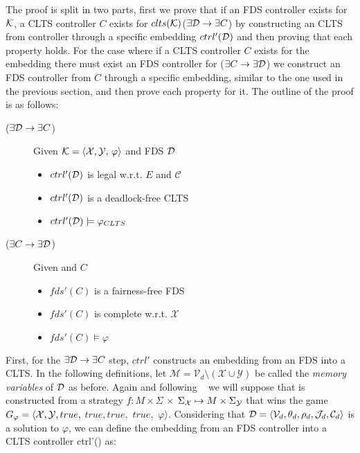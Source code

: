 
The proof is split in two parts, first we prove that if an FDS \fdsD controller exists for $\mathcal{K}$, a CLTS controller $C$ exists for $clts(\mathcal{K})$($\exists \mathcal{D} \rightarrow \exists C$) by constructing an CLTS from controller \fdsD through a specific embedding $ctrl'(\mathcal{D})$ and then proving that each property holds. For the case where if a CLTS controller $C$ exists for the embedding \cltsCPEmbedding there must exist an FDS controller for \fdsControlProblem ($\exists C \rightarrow \exists \mathcal{D}$) we construct an FDS controller from $C$ through a specific embedding, similar to the one used in the previous section, and then prove each property for it. The outline of the proof is as follows:


\begin{description}
	\item[($\exists \mathcal{D} \rightarrow \exists C$)] Given $\fdsControlProblemDef$ and FDS $\mathcal{D}$
		\begin{itemize}
			\item $ctrl'(\mathcal{D})$ is legal w.r.t. $E$ and $\mathcal{C}$
			\item $ctrl'(\mathcal{D})$ is a deadlock-free CLTS			
			\item $ctrl'(\mathcal{D}) \models \varphi_{CLTS}$
		\end{itemize}	
	\item[($\exists C \rightarrow \exists \mathcal{D}$)] Given \cltsCPEmbeddingDef and $C$
\begin{itemize}
	\item $fds'(C)$ is a fairness-free FDS			
	\item $fds'(C)$ is complete w.r.t. $\mathcal{X}$
	\item $fds'(C) \models \varphi$
\end{itemize}	
\end{description}

First,  for the $\exists \mathcal{D} \rightarrow \exists C$ step, $ctrl'$ constructs an embedding from an FDS into a CLTS. In the following definitions, let $\mathcal{M}= \mathcal{V}_d\setminus (\mathcal{X} \cup \mathcal{Y})$ be called the \emph{memory variables} of $\mathcal{D}$ as before.
Again and following ~\cite{bloem2012synthesis} we will suppose that \fdsD is constructed from a strategy $f: M \times \Sigma$ $\times$ $\Sigma_{{\mathcal{X}}} \mapsto M \times \Sigma_{{\mathcal{Y}}}$
that wins the game $G_{\varphi}=\langle {\ensuremath{\mathcal{X}}}, {\mathcal{Y}}, true,$ $true, true,$ $true,$ $\varphi \rangle$. Considering that $\mathcal{D}= \langle \mathcal{V}_d, \theta_d, \rho_d, \mathcal{J}_d, \mathcal{C}_d\rangle$ is a solution to $\varphi$, we can define the embedding from an FDS controller \fdsD into a CLTS controller ctrl'(\fdsD)  as:

